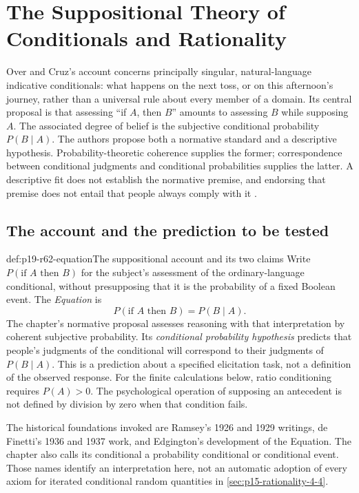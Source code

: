 \chapter{The Suppositional Theory of Conditionals and Rationality}
\label{sec:p19-rationality-6-2}

Over and Cruz's account concerns principally singular, natural-language
indicative conditionals: what happens on the next toss, or on this afternoon's
journey, rather than a universal rule about every member of a domain.
Its central proposal is that assessing ``if \(A\), then \(B\)'' amounts to
assessing \(B\) while supposing \(A\). The associated degree of belief is
the subjective conditional probability \(P(B\mid A)\). The authors propose
both a normative standard and a descriptive hypothesis. Probability-theoretic
coherence supplies the former; correspondence between conditional judgments
and conditional probabilities supplies the latter. A descriptive fit does not
establish the normative premise, and endorsing that premise does not entail
that people always comply with it \cite[pp.~395--401]{OverCruz2021Suppositional}.

\section{The account and the prediction to be tested}
\label{sec:p19-r62-account}

\begin{hbdefinition}{def:p19-r62-equation}{The suppositional account and its two claims}
Write \(P(\text{if }A\text{ then }B)\) for the subject's assessment of
the ordinary-language conditional, without presupposing that it is the
probability of a fixed Boolean event. The \emph{Equation} is
\[
 P(\text{if }A\text{ then }B)=P(B\mid A).
\]
The chapter's normative proposal assesses reasoning with that interpretation
by coherent subjective probability. Its \emph{conditional probability
hypothesis} predicts that people's judgments of the conditional will
correspond to their judgments of \(P(B\mid A)\). This is a prediction
about a specified elicitation task, not a definition of the observed response.
For the finite calculations below, ratio conditioning requires \(P(A)>0\).
The psychological operation of supposing an antecedent is not defined by
division by zero when that condition fails.
\end{hbdefinition}

The historical foundations invoked are Ramsey's 1926 and 1929 writings,
de Finetti's 1936 and 1937 work, and Edgington's development of the Equation.
The chapter also calls its conditional a probability conditional or
conditional event. Those names identify an interpretation here, not an
automatic adoption of every axiom for iterated conditional random quantities
in \cref{sec:p15-rationality-4-4}.

